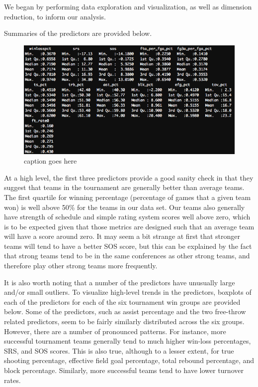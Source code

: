 \documentclass[10pt,a4paper, hidelinks]{article} %
\begin{document}
We began by performing data exploration and visualization, as well as dimension reduction, to inform our analysis.

Summaries of the predictors are provided below.

\begin{figure}[H]
	\centering
	\includegraphics[width=0.7\linewidth]{../fig/Summary}
	\caption{caption goes here}
	\label{fig:summary}
\end{figure} 

At a high level, the first three predictors provide a good sanity check in that they suggest that  teams in the tournament are generally better than average teams. The first quartile for winning percentage (percentage of games that a given team won) is well above 50\% for the teams in our data set. Our teams also generally have strength of schedule and simple rating system scores well above zero, which is to be expected given that those metrics are designed such that an average team will have a score around zero. It may seem a bit strange at first that stronger teams will tend to have a better SOS score, but this can be explained by the fact that strong teams tend to be in the same conferences as other strong teams, and therefore play other strong teams more frequently.

It is also worth noting that a number of the predictors have unusually large and/or small outliers. To visualize high-level trends in the predictors, boxplots of each of the predictors for each of the six tournament win groups are provided below. Some of the predictors, such as assist percentage and the two free-throw related predictors, seem to be fairly similarly distributed across the six groups. However, there are a number of pronounced patterns. For instance, more successful tournament teams generally tend to much higher win-loss percentages, SRS, and SOS scores. This is also true, although to a lesser extent, for true shooting percentage, effective field goal percentage, total rebound percentage, and block percentage. Similarly, more successful teams tend to have lower turnover rates. 
\end{document}
